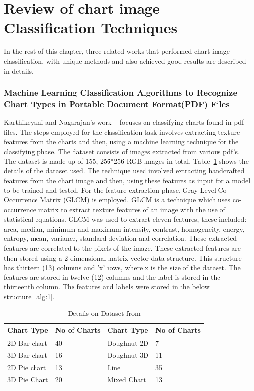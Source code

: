 \documentclass[12pt, a4paper,oneside]{report}
\begin{document}
\section{Review of chart image Classification Techniques}
In the rest of this chapter, three related works that performed chart image classification, with unique methods and also achieved good results are described in details.  

\subsubsection{Machine Learning Classification Algorithms to Recognize Chart Types in Portable Document Format(PDF) Files}
Karthikeyani and Nagarajan's work ~\cite{karthikeyani2012machine} focuses on classifying charts found in pdf files. The steps employed for the classification task involves extracting texture features from the charts and then, using a machine learning technique for the classifying phase. The dataset consists of images extracted from various pdf's. The dataset is made up of 155, 256*256 RGB images in total. Table~\ref{table:pdf} shows the details of the dataset used.
The technique used involved extracting handcrafted features from the chart image and then, using these features as input for a model to be trained and tested.
For the feature extraction phase, Gray Level Co-Occurrence Matrix (GLCM) is employed. GLCM is a technique which uses co-occurrence matrix to extract texture features of an image with the use of statistical equations. GLCM was used to extract eleven features, these included: area, median, minimum and maximum intensity, contrast, homogeneity, energy, entropy, mean, variance, standard deviation and correlation. These extracted features are correlated to the pixels of the image. These extracted features are then stored using a 2-dimensional matrix vector data structure. This structure has thirteen (13) columns and 'x' rows, where x is the size of the dataset. The features are stored in twelve (12) columns and the label is stored in the thirteenth column. The features and labels were stored in the below structure~\ref{alg:1}.

\begin{table}[h]
	\centering {} \small
	\begin{tabular}{|p{3cm}|p{3cm}|p{3cm}|p{3cm}|}
		\hline
		Chart Type & No of Charts & Chart
		Type & No of Charts  \\ \hline
		2D Bar chart & 40 & Doughnut 2D & 7 \\ \hline
		3D Bar chart & 16 & Doughnut 3D & 11\\ \hline
		2D Pie chart & 13 & Line & 35 \\ \hline
		3D Pie Chart & 20 & Mixed Chart& 13 \\ \hline
	\end{tabular}
	\caption {Details on Dataset from \cite{karthikeyani2012machine} }	
	\label{table:pdf}
\end{table}
\end{document}
